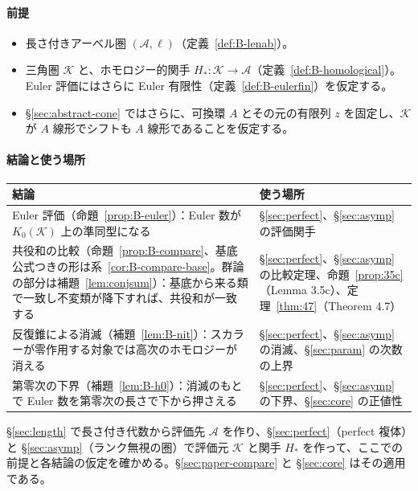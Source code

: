 \documentclass[11pt,a4paper]{ltjsarticle}
\numberwithin{equation}{section}
\theoremstyle{plain}
\theoremstyle{definition}
\theoremstyle{definition}
\begin{document}
\paragraph{前提}
\begin{itemize}
  \item 長さ付きアーベル圏 $(\mathcal{A},\ell)$（定義~\ref{def:B-lenab}）。
  \item 三角圏 $\mathcal{K}$ と、ホモロジー的関手 $H_*\colon\mathcal{K}\to\mathcal{A}$（定義~\ref{def:B-homological}）。Euler 評価にはさらに Euler 有限性（定義~\ref{def:B-eulerfin}）を仮定する。
  \item §\ref{sec:abstract-cone} ではさらに、可換環 $A$ とその元の有限列 $z$ を固定し、$\mathcal{K}$ が $A$ 線形でシフトも $A$ 線形であることを仮定する。
\end{itemize}

\paragraph{結論と使う場所}
\begin{center}
\begin{tabularx}{\textwidth}{>{\raggedright}p{6.2cm}>{\raggedright\arraybackslash}X}
\toprule
結論 & 使う場所 \\
\midrule
Euler 評価（命題~\ref{prop:B-euler}）：Euler 数が $K_0(\mathcal{K})$ 上の準同型になる & §\ref{sec:perfect}、§\ref{sec:asymp} の評価関手 \\
共役和の比較（命題~\ref{prop:B-compare}、基底公式つきの形は系~\ref{cor:B-compare-base}。群論の部分は補題~\ref{lem:conjsum}）：基底から来る類で一致し不変類が降下すれば、共役和が一致する & §\ref{sec:perfect}、§\ref{sec:asymp} の比較定理、命題~\ref{prop:35c}（Lemma 3.5c）、定理~\ref{thm:47}（Theorem 4.7） \\
反復錐による消滅（補題~\ref{lem:B-nit}）：スカラーが零作用する対象では高次のホモロジーが消える & §\ref{sec:perfect}、§\ref{sec:asymp} の消滅、§\ref{sec:param} の次数の上界 \\
第零次の下界（補題~\ref{lem:B-h0}）：消滅のもとで Euler 数を第零次の長さで下から押さえる & §\ref{sec:perfect}、§\ref{sec:asymp} の下界、§\ref{sec:core} の正値性 \\
\bottomrule
\end{tabularx}
\end{center}
§\ref{sec:length} で長さ付き代数から評価先 $\mathcal{A}$ を作り、§\ref{sec:perfect}（perfect 複体）と §\ref{sec:asymp}（ランク無視の圏）で評価元 $\mathcal{K}$ と関手 $H_*$ を作って、ここでの前提と各結論の仮定を確かめる。§\ref{sec:paper-compare} と §\ref{sec:core} はその適用である。
\end{document}
